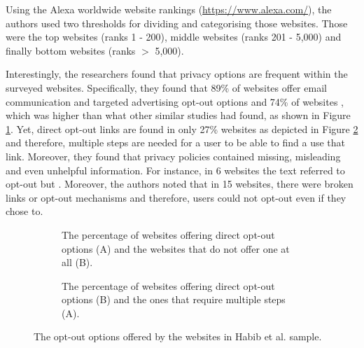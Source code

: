 \documentclass[../main.tex]{subfiles}
\begin{document}
Using the Alexa worldwide website rankings (\url{https://www.alexa.com/}), the authors used two thresholds for dividing and categorising those websites. Those were the top websites (ranks 1 - 200), middle websites (ranks 201 - 5,000) and finally bottom websites (ranks $>$ 5,000). 

Interestingly, the researchers found that privacy options are frequent within the surveyed websites. Specifically, they found that 89\% of websites offer email communication and targeted advertising opt-out options and 74\% of websites , which was higher than what other similar studies had found, as shown in Figure \ref{fig:habib_a}. Yet, direct opt-out links are found in only 27\% websites as depicted in Figure \ref{fig:habib_b} and therefore, multiple steps are needed for a user to be able to find a use that link. Moreover, they found that privacy policies contained missing, misleading and even unhelpful information. For instance, in 6 websites the text referred to opt-out but . Moreover, the authors noted that in 15 websites, there were broken links or opt-out mechanisms and therefore, users could not opt-out even if they chose to.

\begin{figure}[ht]
    \centering
    \begin{subfigure}[b]{0.45\textwidth}
        \centering
        \caption{The percentage of websites offering direct opt-out options (A) and the websites that do not offer one at all (B).}
        \label{fig:habib_a}
    \end{subfigure}
    \hfill
    \begin{subfigure}[b]{0.45\textwidth}
        \centering
        \caption{The percentage of websites offering direct opt-out options (B) and the ones that require multiple steps (A).}
        \label{fig:habib_b}
    \end{subfigure}
    \caption{The opt-out options offered by the websites in Habib et al. sample.}
    \label{fig:habib}
\end{figure}
\end{document}
